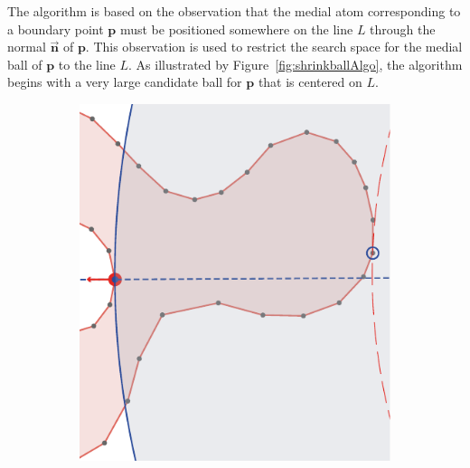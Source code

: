 The algorithm is based on the observation that the medial atom corresponding to a boundary point $\mathbf{p}$ must be positioned somewhere on the line $L$ through the normal $\vec{\mathbf{n}}$ of $\mathbf{p}$.
This observation is used to restrict the search space for the medial ball of $\mathbf{p}$ to the line $L$.
As illustrated by Figure~\ref{fig:shrinkballAlgo}, the algorithm begins with a very large candidate ball for $\mathbf{p}$ that is centered on $L$.
\begin{figure}[tbp]
	\begin{subfigure}{0.245\linewidth}
		\includegraphics[width=\textwidth]{figs/fullBallShrink_1.pdf}
		\label{fig:fullBallShrink_1}
	\end{subfigure}
	\begin{subfigure}{0.245\linewidth}

\end{subfigure}
\end{figure}
